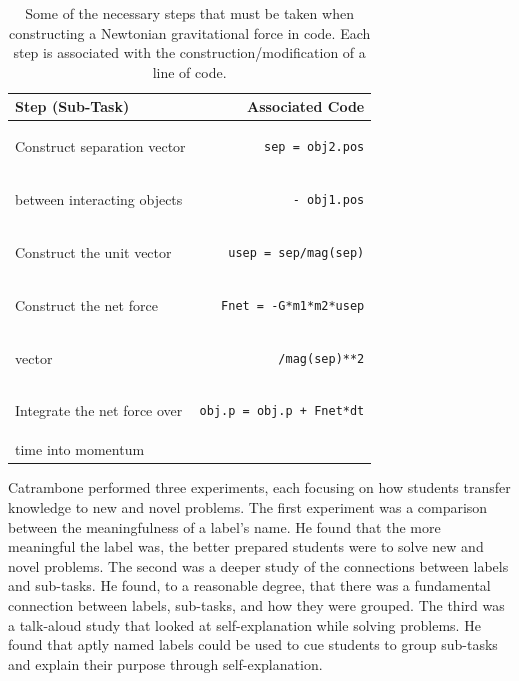 \documentclass{msuphddissertation}
\begin{document}
\begin{doublespace}
\begin{table}[hb]\centering
\begin{tabular}{lr}\hline\hline
Step (Sub-Task) & Associated Code \\\hline
Construct separation vector & \begin{lstlisting}
sep = obj2.pos
\end{lstlisting}\\
between interacting objects & \begin{lstlisting}
         - obj1.pos
\end{lstlisting}\\\hline
Construct the unit vector & \begin{lstlisting}
usep = sep/mag(sep)
\end{lstlisting}\\\hline
Construct the net force & \begin{lstlisting}
Fnet = -G*m1*m2*usep
\end{lstlisting}\\
vector & \begin{lstlisting}
         /mag(sep)**2
\end{lstlisting}\\\hline
Integrate the net force over & \begin{lstlisting}
obj.p = obj.p + Fnet*dt
\end{lstlisting}\\
time into momentum & \\\hline\hline
\end{tabular}\caption{Some of the necessary steps that must be taken when constructing a Newtonian gravitational force in code.  Each step is associated with the construction/modification of a line of code.\label{CH3:TaskAnalysis}}
\end{table}

Catrambone performed three experiments, each focusing on how students transfer knowledge to new and novel problems.  The first experiment was a comparison between the meaningfulness of a label's name.  He found that the more meaningful the label was, the better prepared students were to solve new and novel problems.  The second was a deeper study of the connections between labels and sub-tasks.  He found, to a reasonable degree, that there was a fundamental connection between labels, sub-tasks, and how they were grouped.  The third was a talk-aloud study that looked at self-explanation while solving problems.  He found that aptly named labels could be used to cue students to group sub-tasks and explain their purpose through self-explanation.


\end{doublespace}
\end{document}
